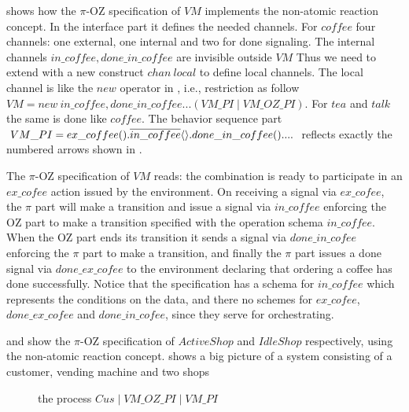  shows how the $\pi$-OZ specification of $VM$ implements the non-atomic reaction concept. In the interface part it defines the needed channels. For $coffee$ four channels: one external, one internal and two for done signaling. The internal channels $in\_coffee,done\_in\_coffee$ are invisible outside $VM$ Thus we need to extend \oz{} with a new construct $chan\ local$ to define local channels. The local channel is like the $new$ operator in \picalc{}, i.e., restriction as follow $VM = new\ in\_coffee,done\_in\_coffee...(VM\_PI\mid VM\_OZ\_PI)$. For $tea$ and $talk$ the same is done like $coffee$. The behavior sequence part $VM\_PI = ex\_coffee().\overline{in\_coffee}\langle\rangle.done\_in\_coffee() .... $ reflects exactly the numbered arrows shown in . 

The $\pi$-OZ specification of $VM$ reads: the combination is ready to participate in an $ex\_cofee$ action issued by the environment. On receiving a signal via $ex\_cofee$, the $\pi$ part will make a transition and issue a signal via $in\_coffee$ enforcing the OZ part to make a transition specified with the operation schema $in\_coffee$. When the OZ part ends its transition it sends a signal via $done\_in\_cofee$ enforcing the $\pi$ part to make a transition, and finally the $\pi$ part issues a done signal via $done\_ex\_cofee$ to the environment declaring that ordering a coffee has done successfully. Notice that the specification has a schema for $in\_coffee$ which represents the conditions on the data, and there no schemes for $ex\_cofee$, $done\_ex\_cofee$ and $done\_in\_cofee$, since they serve for orchestrating.

 and  show the $\pi$-OZ specification of $ActiveShop$ and $IdleShop$ respectively, using the non-atomic reaction concept.  shows a big picture of a system consisting of a customer, vending machine and two shops

\begin{figure}[H]%
\centering
{}%
\caption{the process $Cus \mid VM\_OZ\_PI \mid VM\_PI$}
\label{binary_reactoin}%
\end{figure}

